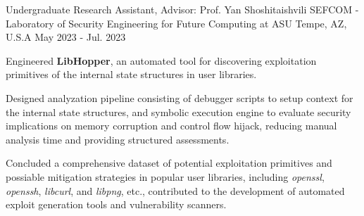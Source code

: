 \begin{cventries}
  \cventry
    {Undergraduate Research Assistant, Advisor: Prof. Yan Shoshitaishvili} %
    {SEFCOM - Laboratory of Security Engineering for Future Computing at ASU} %
    {Tempe, AZ, U.S.A} %
    {May 2023 - Jul. 2023} %
    {
      \begin{cvitems} %
        \item {Engineered \textbf{LibHopper}, an automated tool for discovering exploitation primitives of the internal state structures in user libraries.}
        \item {Designed analyzation pipeline consisting of debugger scripts to setup context for the internal state structures, and symbolic execution engine to evaluate security implications on memory corruption and control flow hijack, reducing manual analysis time and providing structured assessments.}
        \item {Concluded a comprehensive dataset of potential exploitation primitives and possiable mitigation strategies in popular user libraries, including \textit{openssl}, \textit{openssh}, \textit{libcurl}, and \textit{libpng}, etc., contributed to the development of automated exploit generation tools and vulnerability scanners.}
      \end{cvitems}
    }

\end{cventries}
